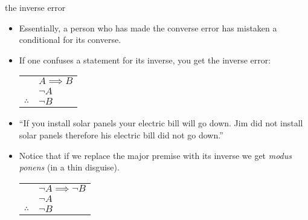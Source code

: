 \documentclass[landscape]{beamer}
\begin{document}
\begin{frame}{the inverse error}
\begin{itemize}
\item Essentially, a person who has made the converse error has mistaken a conditional for its converse. \pause
\item If one confuses a statement for its inverse, you get the inverse error: \pause

\begin{center}
\begin{tabular}{cl}
 & $A \implies B$ \\
 & $\lnot A$ \\ \hline
$\therefore$ & $\lnot B$\\
\end{tabular}
\end{center}

\pause
\item ``If you install solar panels your electric bill will go down.  Jim did not install solar panels therefore his electric bill did not go down.'' \pause

\item Notice that if we replace the major premise with its inverse we get {\em modus ponens} \pause (in a thin disguise). \pause

\begin{center}
\begin{tabular}{cl}
 & $\lnot A \implies \lnot B$ \\
 & $\lnot A$ \\ \hline
$\therefore$ & $\lnot B$\\
\end{tabular}
\end{center}

 
\end{itemize}
\end{frame}
\end{document}

